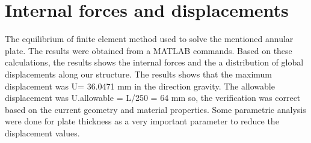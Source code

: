 \section*{Internal forces and displacements}
The equilibrium of finite element method used to solve the mentioned annular
plate. The results were obtained from a MATLAB commands. Based on these
calculations, the results shows the internal forces and the a distribution of
global displacements along our structure. The results shows that the maximum
displacement was U= 36.0471 mm in the direction gravity. The allowable
displacement was U.allowable = L/250 = 64 mm so, the verification was correct
based on the current geometry and material properties. Some parametric analysis
were done for plate thickness as a very important parameter to reduce the
displacement values.